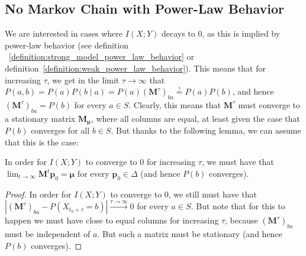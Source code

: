 \documentclass[../../main.tex]{subfiles}
\begin{document}
\subsection{No Markov Chain with Power-Law Behavior}
    We are interested in cases where $I(X; Y)$ decays to $0$, as this is implied by power-law behavior (see definition ~\ref{definition:strong_model_power_law_behavior} or definition~\ref{definition:weak_power_law_behavior}). This means that for increasing $\tau$, we get in the limit $\tau \to \infty$ that $P(a, b) = P(a) P(b \mid a) = P(a) (\bm{M}^\tau)_{ba} \overset{!}{=} P(a) P(b)$, and hence $(\bm{M}^\tau)_{ba} = P(b)$ for every $a \in S$. Clearly, this means that $\bm{M}^\tau$ must converge to a stationary matrix $\bm{M_\mu}$, where all columns are equal, at least given the case that $P(b)$ converges for all $b \in S$. But thanks to the following lemma, we can assume that this is the case:

    \begin{lemma}
        In order for $I(X; Y)$ to converge to $0$ for increasing $\tau$, we must have that $\lim_{t \to \infty}\bm{M}^t \bm{p}_0 = \bm{\mu}$ for every $\bm{p}_0 \in \Delta$ (and hence $P(b)$ converges).
    \end{lemma}
    \vspace{-2.5em}
    \begin{proof}
        In order for $I(X; Y)$ to converge to $0$, we still must have that $|(\bm{M}^\tau)_{ba} - P(X_{t_0 + \tau} = b)| \xrightarrow{\tau \to \infty} 0$ for every $a \in S$. But note that for this to happen we must have close to equal columns for increasing $\tau$, because $(\bm{M}^\tau)_{ba}$ must be independent of $a$. But such a matrix must be stationary (and hence $P(b)$ converges).
    \end{proof}
\end{document}
